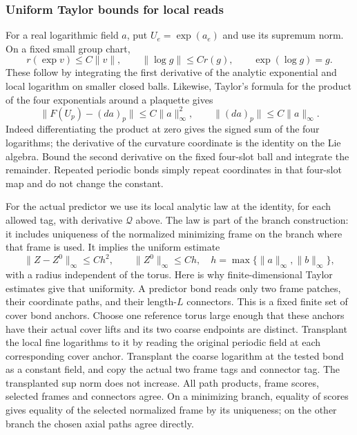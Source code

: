 \subsubsection{Uniform Taylor bounds for local reads}
For a real logarithmic field $a$, put $U_e=\exp(a_e)$ and use its
supremum norm. On a fixed small group chart,
\[
 r(\exp v)\le C\|v\|,\qquad
 \|\log g\|\le C r(g),\qquad \exp(\log g)=g.
\]
These follow by integrating the first derivative of the analytic
exponential and local logarithm on smaller closed balls. Likewise,
Taylor's formula for the product of the four exponentials around a
plaquette gives
\begin{equation}\label{eq:unhit-face-taylor}
 \|F(U_p)-(d a)_p\|\le C\|a\|_\infty^2,
 \qquad \|(d a)_p\|\le C\|a\|_\infty.
\end{equation}
Indeed differentiating the product at zero gives the signed sum of
the four logarithms; the derivative of the curvature coordinate is
the identity on the Lie algebra. Bound the second derivative on the
fixed four-slot ball and integrate the remainder. Repeated periodic
bonds simply repeat coordinates in that four-slot map and do not
change the constant.

For the actual predictor we use its local analytic law at the
identity, for each allowed tag, with derivative $\mathcal Q$ above.
The law is part of the branch construction: it includes uniqueness
of the normalized minimizing frame on the branch where that frame
is used. It implies the uniform estimate
\begin{equation}\label{eq:unhit-predictor-taylor}
 \|Z-Z^0\|_\infty\le C h^2,\qquad
 \|Z^0\|_\infty\le Ch,
 \quad h=\max\{\|a\|_\infty,\|b\|_\infty\},
\end{equation}
with a radius independent of the torus. Here is why finite-dimensional
Taylor estimates give that uniformity. A predictor bond reads only
two frame patches, their coordinate paths, and their length-$L$
connectors. This is a fixed finite set of cover bond anchors. Choose
one reference torus large enough that these anchors have their actual
cover lifts and its two coarse endpoints are distinct. Transplant
the local fine logarithms to it by reading the original periodic
field at each corresponding cover anchor. Transplant the coarse
logarithm at the tested bond as a constant field, and copy the actual
two frame tags and connector tag. The transplanted sup norm does not
increase. All path products, frame scores, selected frames and
connectors agree. On a minimizing branch, equality of scores gives
equality of the selected normalized frame by its uniqueness; on the
other branch the chosen axial paths agree directly.

